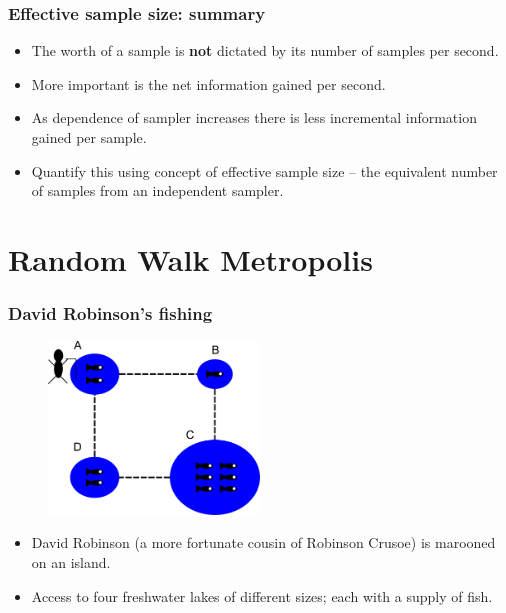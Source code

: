 \documentclass[handout]{beamer}
\begin{document}
\begin{frame}
	\frametitle{Effective sample size: summary}
	\begin{itemize}
		\item<2-> The worth of a sample is \textbf{not} dictated by its number of samples per second.
		\item<3-> More important is the net information gained per second.
		\item<4-> As dependence of sampler increases there is less incremental information gained per sample.
		\item<5-> Quantify this using concept of effective sample size -- the equivalent number of samples from an independent sampler.
	\end{itemize}
\end{frame}


\section{Random Walk Metropolis}
\frame{\tableofcontents[currentsection]}

\begin{frame}
\frametitle{David Robinson's fishing}

\begin{figure}[ht]
\centerline{\includegraphics[width=0.5\textwidth]{animations_figures/lec4_fishMetropolis.pdf}}
\end{figure}

\begin{itemize}
\item<2-> David Robinson (a more fortunate cousin of Robinson Crusoe) is marooned on an island.
\item<3-> Access to four freshwater lakes of different sizes; each with a supply of fish.
\end{itemize}

\end{frame}
\end{document}
